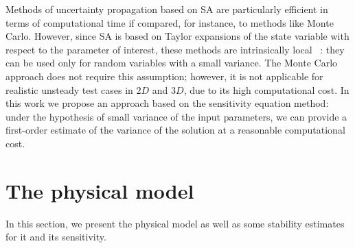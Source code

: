 Methods of uncertainty propagation based on SA are particularly efficient in terms of computational time if compared, for instance, to methods like Monte Carlo. However, since SA is based on Taylor expansions of the state variable with respect to the parameter of interest, these methods are intrinsically local \cite{delenne2014propagation}~: they can be used only for random variables with a small variance. The Monte Carlo approach does not require this assumption; however, it is not applicable for realistic unsteady test cases in $2D$ and $3D$, due to its high computational cost. In this work we propose an approach based on the sensitivity equation method: under the hypothesis of small variance of the input parameters, we can provide a first-order estimate of the variance of the solution at a reasonable computational cost. 
\newpage
{}
\chapter{The physical model}
\label{sec_physical_model}
In this section, we present the physical model as well as some stability estimates for it and its sensitivity.
